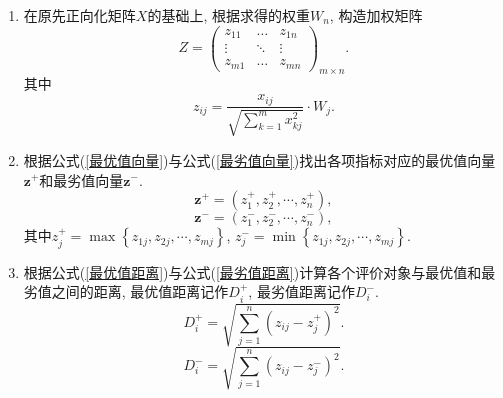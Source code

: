\documentclass[11pt, fontset = windows]{article}
\begin{document}
\begin{enumerate}
\begin{enumerate}
              \item 在原先正向化矩阵$X$的基础上, 根据求得的权重$W_n$, 构造加权矩阵
                    \begin{equation}
                        Z = \begin{pmatrix}
                            z_{11} & \dots  & z_{1n} \\
                            \vdots & \ddots & \vdots \\
                            z_{m1} & \dots  & z_{mn}
                        \end{pmatrix}_{m\times n}.
                    \end{equation}
                    其中
                    \begin{equation}
                        z_{ij}=\frac{x_{ij}}{\sqrt{ \sum_{k=1}^{m}x_{kj}^{2} }}\cdot W_j.
                    \end{equation}

              \item 根据公式(\ref{最优值向量})与公式(\ref{最劣值向量})找出各项指标对应的最优值向量$\boldsymbol{z}^+$和最劣值向量$\boldsymbol{z}^-$.
                    \begin{equation}
                        \label{最优值向量}
                        \boldsymbol{z}^+=\left(z_1^+,z_2^+,\cdots,z_n^+ \right),
                    \end{equation}
                    \begin{equation}
                        \label{最劣值向量}
                        \boldsymbol{z}^-=\left(z_1^-,z_2^-,\cdots,z_n^-\right),
                    \end{equation}
                    其中$z_j^+ = \max\left\{ z_{1j}, z_{2j}, \cdots, z_{mj} \right\}$, $z_j^- = \min\left\{ z_{1j}, z_{2j}, \cdots, z_{mj} \right\}.$

              \item 根据公式(\ref{最优值距离})与公式(\ref{最劣值距离})计算各个评价对象与最优值和最劣值之间的距离, 最优值距离记作$D_i^+$, 最劣值距离记作$D_i^-$.
                    \begin{equation}
                        \label{最优值距离}
                        D_i^+=\sqrt{\sum_{j=1}^{n}\left( z_{ij}-z_j^+ \right)^2}.
                    \end{equation}
                    \begin{equation}
                        \label{最劣值距离}
                        D_i^-=\sqrt{\sum_{j=1}^{n}\left( z_{ij}-z_j^- \right)^2}.
                    \end{equation}


\end{enumerate}
\end{enumerate}
\end{document}
